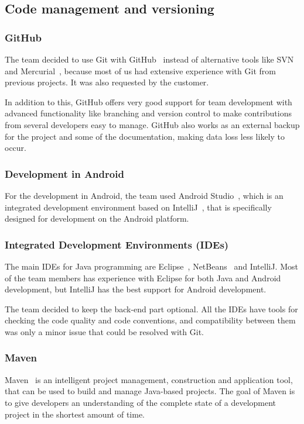 \subsection{Code management and versioning}
\subsubsection{GitHub}
The team decided to use Git with GitHub~\cite{github} instead of alternative tools like SVN~\cite{svn} and Mercurial~\cite{mercurial}, because most of us had extensive experience with Git from previous projects. It was also requested by the customer. 

In addition to this, GitHub offers very good support for team development with advanced functionality like branching and version control to make contributions from several developers easy to manage. GitHub also works as an external backup for the project and some of the documentation, making data loss less likely to occur.

\subsubsection{Development in Android}
For the development in Android, the team used Android Studio~\cite{android-studio}, which is an integrated development environment based on IntelliJ~\cite{intellij}, that is specifically designed for development on the Android platform.

\subsubsection{Integrated Development Environments (IDEs)}
The main IDEs for Java programming are Eclipse~\cite{eclipse}, NetBeans~\cite{netbeans} and IntelliJ. Most of the team members has experience with Eclipse for both Java and Android development, but IntelliJ has the best support for Android development.

The team decided to keep the back-end part optional. All the IDEs have tools for checking the code quality and code conventions, and compatibility between them was only a minor issue that could be resolved with Git.

\subsubsection{Maven}
Maven~\cite{maven} is an intelligent project management, construction and application tool, that can be used to build and manage Java-based projects. The goal of Maven is to give developers an understanding of the complete state of a development project in the shortest amount of time.

